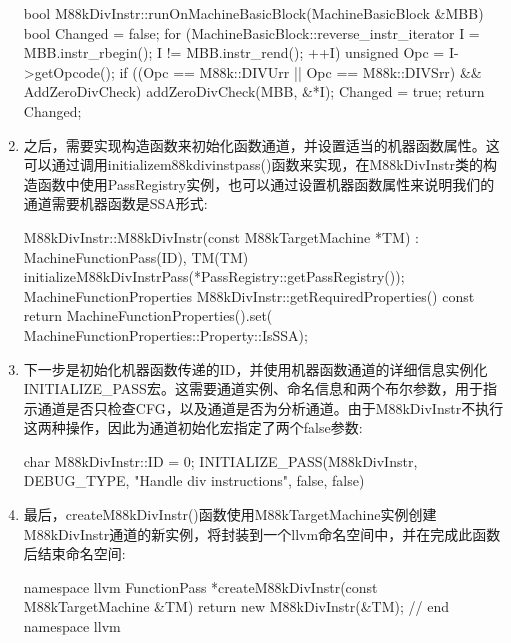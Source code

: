 \begin{enumerate}
\begin{cpp}
bool M88kDivInstr::runOnMachineBasicBlock(MachineBasicBlock
&MBB) {
    bool Changed = false;
    for (MachineBasicBlock::reverse_instr_iterator I =
    MBB.instr_rbegin();
            I != MBB.instr_rend(); ++I) {
        unsigned Opc = I->getOpcode();
        if ((Opc == M88k::DIVUrr || Opc == M88k::DIVSrr) &&
        AddZeroDivCheck) {
            addZeroDivCheck(MBB, &*I);
            Changed = true;
        }
    }
    return Changed;
}
\end{cpp}

\item
之后，需要实现构造函数来初始化函数通道，并设置适当的机器函数属性。这可以通过调用initializem88kdivinstpass()函数来实现，在M88kDivInstr类的构造函数中使用PassRegistry实例，也可以通过设置机器函数属性来说明我们的通道需要机器函数是SSA形式:

\begin{cpp}
M88kDivInstr::M88kDivInstr(const M88kTargetMachine *TM)
: MachineFunctionPass(ID), TM(TM) {
    initializeM88kDivInstrPass(*PassRegistry::getPassRegistry());
}
MachineFunctionProperties M88kDivInstr::getRequiredProperties()
const {
    return MachineFunctionProperties().set(
        MachineFunctionProperties::Property::IsSSA);
}
\end{cpp}

\item
下一步是初始化机器函数传递的ID，并使用机器函数通道的详细信息实例化INITIALIZE\_PASS宏。这需要通道实例、命名信息和两个布尔参数，用于指示通道是否只检查CFG，以及通道是否为分析通道。由于M88kDivInstr不执行这两种操作，因此为通道初始化宏指定了两个false参数:

\begin{cpp}
char M88kDivInstr::ID = 0;
INITIALIZE_PASS(M88kDivInstr, DEBUG_TYPE, "Handle div instructions", false, false)
\end{cpp}

\item
最后，createM88kDivInstr()函数使用M88kTargetMachine实例创建M88kDivInstr通道的新实例，将封装到一个llvm命名空间中，并在完成此函数后结束命名空间:

\begin{cpp}
namespace llvm {
FunctionPass *createM88kDivInstr(const M88kTargetMachine &TM) {
    return new M88kDivInstr(&TM);
}
} // end namespace llvm
\end{cpp}
\end{enumerate}




